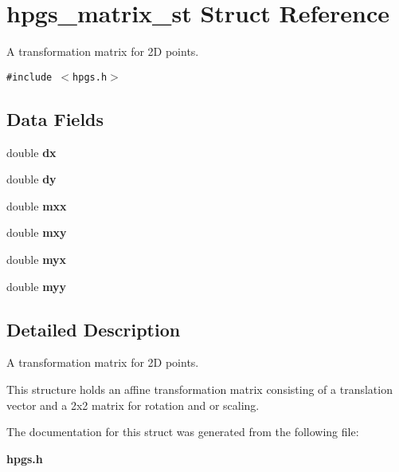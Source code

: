 \section{hpgs\_\-matrix\_\-st Struct Reference}
\label{structhpgs__matrix__st}
A transformation matrix for 2D points.  


{\tt \#include $<$hpgs.h$>$}

\subsection*{Data Fields}
\begin{CompactItemize}
\item 
double \textbf{dx}\label{structhpgs__matrix__st_97c0424c4d0380528e0ae7c0b2c9181a}

\item 
double \textbf{dy}\label{structhpgs__matrix__st_979e45531c6d72be71478efe48385596}

\item 
double \textbf{mxx}\label{structhpgs__matrix__st_1d48e919c1f8dce2636e3dbfedcfd244}

\item 
double \textbf{mxy}\label{structhpgs__matrix__st_8917fe3c7b236ef57d18151810658eac}

\item 
double \textbf{myx}\label{structhpgs__matrix__st_7c0648d4a5def84a2cbc604bdac6f61c}

\item 
double \textbf{myy}\label{structhpgs__matrix__st_5d5b38c054b1f426aaed1579b0fcf887}

\end{CompactItemize}


\subsection{Detailed Description}
A transformation matrix for 2D points. 

This structure holds an affine transformation matrix consisting of a translation vector and a 2x2 matrix for rotation and or scaling. 

The documentation for this struct was generated from the following file:\begin{CompactItemize}
\item 
{\bf hpgs.h}\end{CompactItemize}
